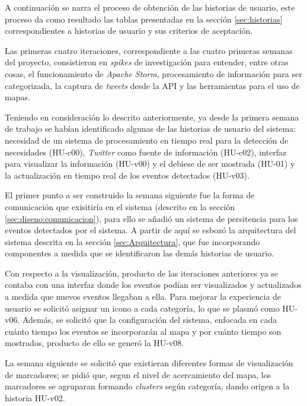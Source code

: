 A continuación se narra el proceso de obtención de las historias de usuario, este proceso da como resultado las tablas presentadas en la sección \ref{sec:historias} correspondientes a historias de usuario y sus criterios de aceptación.

Las primeras cuatro iteraciones, correspondiente a las cuatro primeras semanas del proyecto, consistieron en \textit{spikes} de investigación para entender, entre otras cosas, el funcionamiento de \textit{Apache Storm}, procesamiento de información para ser categorizada, la captura de \textit{tweets} desde la API y las herramientas para el uso de mapas. 

Teniendo en consideración lo descrito anteriormente, ya desde la primera semana de trabajo se habían identificado algunas de las historias de usuario del sistema: necesidad de un sistema de procesamiento en tiempo real para la detección de necesidades (HU-c00), \textit{Twitter} como fuente de información (HU-c02), interfaz para visualizar la información (HU-v00) y el debiese de ser mostrada (HU-01) y la actualización en tiempo real de los eventos detectados (HU-v03).

El primer punto a ser construido la semana siguiente fue la forma de comunicación que exisitiría en el sistema (descrito en la sección \ref{sec:diseno:comunicacion}), para ello se añadió un sistema de persitencia para los eventos detectados por el sistema. A partir de aquí se esbozó la arquitectura del sistema descrita en la sección \ref{sec:Arquitectura}, que fue incorporando componentes a medida que se identificaron las demás historias de usuario.

Con respecto a la visualización, producto de las iteraciones anteriores ya se contaba con una interfaz donde los eventos podían ser visualizados y actualizados a medida que nuevos eventos llegaban a ella. Para mejorar la experiencia de usuario se solicitó asignar un icono a cada categoría, lo que se plasmó como HU-v06. Además, se solicitó que la configuración del sistema, enfocada en cada cuánto tiempo los eventos se incorporarán al mapa y por cuánto tiempo son mostrados, producto de ello se generó la HU-v08.

La semana siguiente se solicitó que existieran diferentes formas de visualización de marcadores; se pidió que, segun el nivel de acercamiento del mapa, los marcadores se agruparan formando \textit{clusters} según categoría, dando origen a la historia HU-v02.

